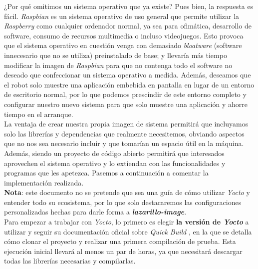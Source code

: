 ¿Por qué omitimos un sistema operativo que ya existe? Pues bien, la respuesta es fácil. \textit{Raspbian} es un sistema operativo de uso general que permite utilizar la \textit{Raspberry} como cualquier ordenador normal, ya sea para ofimática, desarrollo de software, consumo de recursos multimedia o incluso videojuegos. Esto provoca que el sistema operativo en cuestión venga con demasiado \textit{bloatware} (software innecesario que no se utiliza) preinstalado de base; y llevaría más tiempo modificar la imagen de \textit{Raspbian} para que no contenga todo el software no deseado que confeccionar un sistema operativo a medida. Además, deseamos que el robot solo muestre una aplicación embebida en pantalla en lugar de un entorno de escritorio normal, por lo que podemos prescindir de este entorno completo y configurar nuestro nuevo sistema para que solo muestre una aplicación y ahorre tiempo en el arranque.\\

La ventaja de crear nuestra propia imagen de sistema permitirá que incluyamos solo las librerías y dependencias que realmente necesitemos, obviando aspectos que no nos sea necesario incluir y que tomarían un espacio útil en la máquina. Además, siendo un proyecto de código abierto permitirá que interesados aprovechen el sistema operativo y lo extiendan con las funcionalidades y programas que les apetezca. Pasemos a continuación a comentar la implementación realizada.\\

\textbf{Nota}: este documento no se pretende que sea una guía de cómo utilizar \textit{Yocto} y entender todo su ecosistema, por lo que solo destacaremos las configuraciones personalizadas hechas para darle forma a \textbf{\textit{lazarillo-image}}.\\

Para empezar a trabajar con \textit{Yocto}, lo primero es elegir \textbf{la versión de \textit{Yocto}} a utilizar y seguir su documentación oficial sobre \textit{Quick Build} \cite{yocto-quick-build}, en la que se detalla cómo clonar el proyecto y realizar una primera compilación de prueba. Esta ejecución inicial llevará al menos un par de horas, ya que necesitará descargar todas las librerías necesarias y compilarlas.\\

